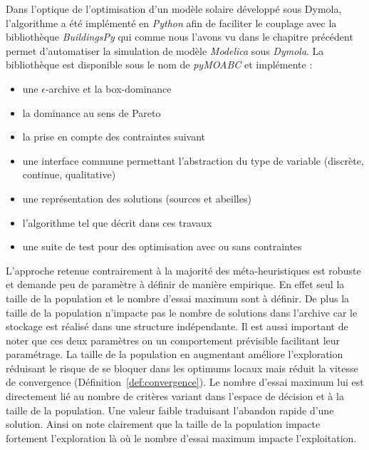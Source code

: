 Dans l’optique de l’optimisation d’un modèle solaire développé sous Dymola, l’algorithme
a été implémenté en \emph{Python} afin de faciliter le couplage avec la bibliothèque
\emph{BuildingsPy} qui comme nous l’avons vu dans le chapitre précédent permet d’automatiser
la simulation de modèle \emph{Modelica} sous \emph{Dymola}. La bibliothèque est
disponible sous le nom de \emph{pyMOABC} et implémente :
\begin{itemize}
  \item une $\epsilon$-archive et la box-dominance
  \item la dominance au sens de Pareto
  \item la prise en compte des contraintes suivant \cite{Woldesenbet20073077}
  \item une interface commune permettant l’abstraction du type de variable (discrète, continue, qualitative)
  \item une représentation des solutions (sources et abeilles)
  \item l’algorithme tel que décrit dans ces travaux
  \item une suite de test pour des optimisation avec ou sans contraintes
\end{itemize}

L’approche retenue contrairement à la majorité des méta-heuristiques est robuste et demande
peu de paramètre à définir de manière empirique. En effet seul la taille de la population
et le nombre d’essai maximum sont à définir. De plus la taille de la population
n’impacte pas le nombre de solutions dans l’archive car le stockage est réalisé dans
une structure indépendante. Il est aussi important de noter que ces deux paramètres
on un comportement prévisible facilitant leur paramétrage. La
taille de la population en augmentant améliore l’exploration réduisant le risque
de se bloquer dans les optimums locaux mais réduit la vitesse de convergence (Définition~\ref{def:convergence}).
Le nombre d’essai maximum lui est directement lié au nombre de critères variant
dans l’espace de décision et à la taille de la population. Une valeur faible traduisant
l’abandon rapide d’une solution. Ainsi on note clairement que la taille de la population
impacte fortement l’exploration là où le nombre d’essai maximum impacte l’exploitation.

